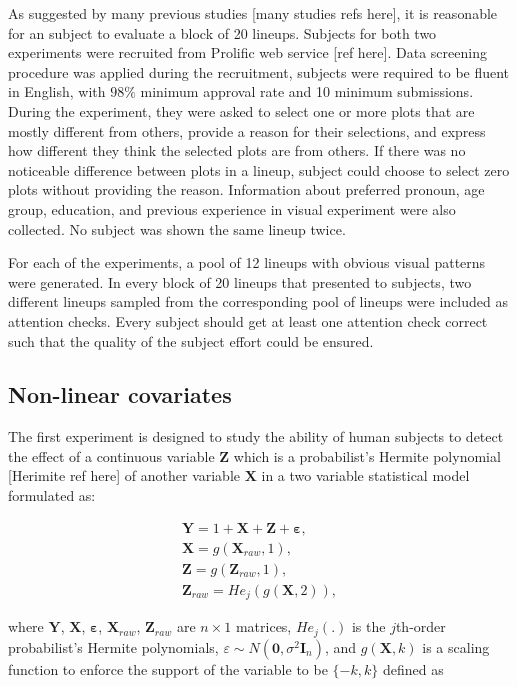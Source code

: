 \documentclass[]{interact}
\theoremstyle{plain}%
\theoremstyle{definition}
\theoremstyle{remark}
\begin{document}
As suggested by many previous studies {[}many studies refs here{]}, it
is reasonable for an subject to evaluate a block of 20 lineups. Subjects
for both two experiments were recruited from Prolific web service {[}ref
here{]}. Data screening procedure was applied during the recruitment,
subjects were required to be fluent in English, with \(98\%\) minimum
approval rate and 10 minimum submissions. During the experiment, they
were asked to select one or more plots that are mostly different from
others, provide a reason for their selections, and express how different
they think the selected plots are from others. If there was no
noticeable difference between plots in a lineup, subject could choose to
select zero plots without providing the reason. Information about
preferred pronoun, age group, education, and previous experience in
visual experiment were also collected. No subject was shown the same
lineup twice.

For each of the experiments, a pool of 12 lineups with obvious visual
patterns were generated. In every block of 20 lineups that presented to
subjects, two different lineups sampled from the corresponding pool of
lineups were included as attention checks. Every subject should get at
least one attention check correct such that the quality of the subject
effort could be ensured.

\hypertarget{non-linear-covariates}{%
\subsection{Non-linear covariates}\label{non-linear-covariates}}

The first experiment is designed to study the ability of human subjects
to detect the effect of a continuous variable \(\boldsymbol{Z}\) which
is a probabilist's Hermite polynomial {[}Herimite ref here{]} of another
variable \(\boldsymbol{X}\) in a two variable statistical model
formulated as:

\begin{align} \label{eq:nonlinearity-model}
\boldsymbol{Y} = 1 + \boldsymbol{X} + \boldsymbol{Z} + \boldsymbol{\varepsilon},\\
\boldsymbol{X} = g(\boldsymbol{X}_{raw}, 1), \\
\boldsymbol{Z} = g(\boldsymbol{Z}_{raw}, 1), \\
\boldsymbol{Z}_{raw} = He_j(g(\boldsymbol{X}, 2)),
\end{align}

where \(\boldsymbol{Y}\), \(\boldsymbol{X}\),
\(\boldsymbol{\varepsilon}\), \(\boldsymbol{X}_{raw}\),
\(\boldsymbol{Z}_{raw}\) are \(n\times1\) matrices, \(He_{j}(.)\) is the
\(j\)th-order probabilist's Hermite polynomials,
\(\varepsilon \sim N(\boldsymbol{0}, \sigma^2\boldsymbol{I}_n)\), and
\(g(\boldsymbol{X}, k)\) is a scaling function to enforce the support of
the variable to be \(\{-k, k\}\) defined as
\end{document}
